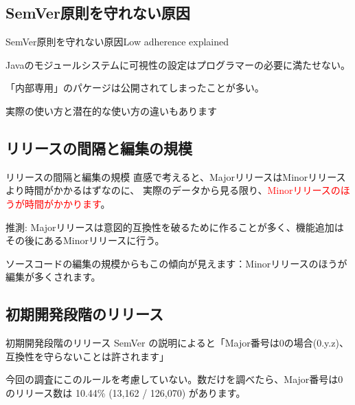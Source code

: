 \subsection{SemVer原則を守れない原因}
\begin{frame}{SemVer原則を守れない原因}{Low adherence explained}

{\small
Javaのモジュールシステムに可視性の設定はプログラマーの必要に満たせない。

「内部専用」のパケージは公開されてしまったことが多い。
}


実際の使い方と潜在的な使い方の違いもあります

\end{frame}
\subsection{リリースの間隔と編集の規模}
\begin{frame}{リリースの間隔と編集の規模}
直感で考えると、MajorリリースはMinorリリースより時間がかかるはずなのに、
実際のデータから見る限り、\textcolor{red}{Minorリリースのほうが時間がかかります}。

\pause\vspace{1em}

推測: Majorリリースは意図的互換性を破るために作ることが多く、機能追加はその後にあるMinorリリースに行う。

\pause\vspace{1em}

ソースコードの編集の規模からもこの傾向が見えます：Minorリリースのほうが編集が多くされます。
\end{frame}
\subsection{初期開発段階のリリース}
\begin{frame}{初期開発段階のリリース}
SemVer の説明によると「Major番号は0の場合(0.y.z)、互換性を守らないことは許されます」

\pause\vspace{1em}

今回の調査にこのルールを考慮していない。数だけを調べたら、Major番号は0のリリース数は
10.44\% (13,162 / 126,070) があります。

\end{frame}
